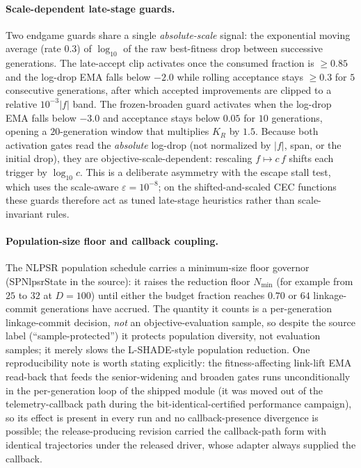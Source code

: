 \documentclass[10pt,a4paper]{article}
\begin{document}
\paragraph{Scale-dependent late-stage guards.}
Two endgame guards share a single \emph{absolute-scale} signal: the exponential moving
average (rate $0.3$) of $\log_{10}$ of the raw best-fitness drop between successive
generations.  The late-accept clip activates once the consumed fraction is $\ge 0.85$ and
the log-drop EMA falls below $-2.0$ while rolling acceptance stays $\ge 0.3$ for $5$
consecutive generations, after which accepted improvements are clipped to a relative
$10^{-3}\lvert f\rvert$ band.  The frozen-broaden guard activates when the log-drop EMA
falls below $-3.0$ and acceptance stays below $0.05$ for $10$ generations, opening a
$20$-generation window that multiplies $K_R$ by $1.5$.  Because both activation gates
read the \emph{absolute} log-drop (not normalized by $\lvert f\rvert$, span, or the
initial drop), they are objective-scale-dependent: rescaling $f\mapsto c\,f$ shifts each
trigger by $\log_{10} c$.  This is a deliberate asymmetry with the escape stall test,
which uses the scale-aware $\varepsilon=10^{-8}$; on the shifted-and-scaled CEC functions
these guards therefore act as tuned late-stage heuristics rather than scale-invariant
rules.


\paragraph{Population-size floor and callback coupling.}
The NLPSR population schedule carries a minimum-size floor governor
(SPNlpsrState in the source): it raises the reduction floor $N_{\min}$ (for
example from $25$ to $32$ at $D=100$) until either the budget fraction reaches $0.70$ or
$64$ linkage-commit generations have accrued.  The quantity it counts is a per-generation
linkage-commit decision, \emph{not} an objective-evaluation sample, so despite the source
label (``sample-protected'') it protects population diversity, not evaluation samples;
it merely slows the L-SHADE-style population reduction.  One reproducibility note is
worth stating explicitly: the fitness-affecting link-lift EMA read-back that feeds the
senior-widening and broaden gates runs unconditionally in the per-generation loop of the
shipped module (it was moved out of the telemetry-callback path during the
bit-identical-certified performance campaign), so its effect is present in every run and
no callback-presence divergence is possible; the release-producing revision carried the
callback-path form with identical trajectories under the released driver, whose adapter
always supplied the callback.
\end{document}
